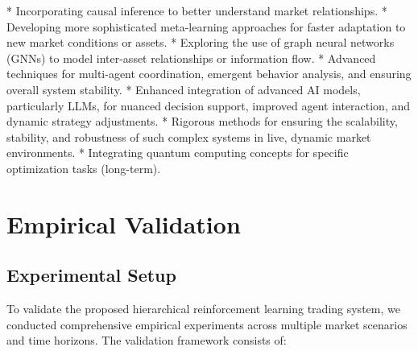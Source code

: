\documentclass[11pt,a4paper]{article}
\begin{document}
    *   Incorporating causal inference to better understand market relationships.
    *   Developing more sophisticated meta-learning approaches for faster adaptation to new market conditions or assets.
    *   Exploring the use of graph neural networks (GNNs) to model inter-asset relationships or information flow.
    *   Advanced techniques for multi-agent coordination, emergent behavior analysis, and ensuring overall system stability.
    *   Enhanced integration of advanced AI models, particularly LLMs, for nuanced decision support, improved agent interaction, and dynamic strategy adjustments.
    *   Rigorous methods for ensuring the scalability, stability, and robustness of such complex systems in live, dynamic market environments.
    *   Integrating quantum computing concepts for specific optimization tasks (long-term).


\section{Empirical Validation}

\subsection{Experimental Setup}

To validate the proposed hierarchical reinforcement learning trading system, we conducted comprehensive empirical experiments across multiple market scenarios and time horizons. The validation framework consists of:
\end{document}
